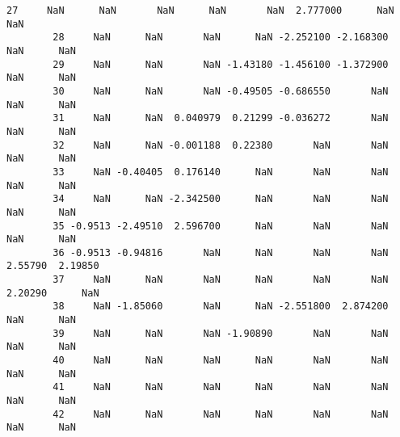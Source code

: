 \documentclass[11pt]{article}
\begin{document}
\begin{Verbatim}[commandchars=\\\{\}]
        27     NaN      NaN       NaN      NaN       NaN  2.777000      NaN      NaN   
        28     NaN      NaN       NaN      NaN -2.252100 -2.168300      NaN      NaN   
        29     NaN      NaN       NaN -1.43180 -1.456100 -1.372900      NaN      NaN   
        30     NaN      NaN       NaN -0.49505 -0.686550       NaN      NaN      NaN   
        31     NaN      NaN  0.040979  0.21299 -0.036272       NaN      NaN      NaN   
        32     NaN      NaN -0.001188  0.22380       NaN       NaN      NaN      NaN   
        33     NaN -0.40405  0.176140      NaN       NaN       NaN      NaN      NaN   
        34     NaN      NaN -2.342500      NaN       NaN       NaN      NaN      NaN   
        35 -0.9513 -2.49510  2.596700      NaN       NaN       NaN      NaN      NaN   
        36 -0.9513 -0.94816       NaN      NaN       NaN       NaN  2.55790  2.19850   
        37     NaN      NaN       NaN      NaN       NaN       NaN  2.20290      NaN   
        38     NaN -1.85060       NaN      NaN -2.551800  2.874200      NaN      NaN   
        39     NaN      NaN       NaN -1.90890       NaN       NaN      NaN      NaN   
        40     NaN      NaN       NaN      NaN       NaN       NaN      NaN      NaN   
        41     NaN      NaN       NaN      NaN       NaN       NaN      NaN      NaN   
        42     NaN      NaN       NaN      NaN       NaN       NaN      NaN      NaN   
        

\end{Verbatim}
\end{document}
